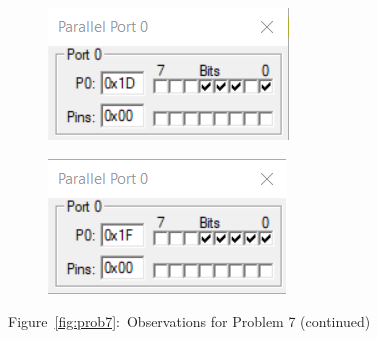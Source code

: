 \documentclass{lab_sheet}
\begin{document}
\begin{figure}[H]
\begin{subfigure}{.5\textwidth}
  \caption{}
  \label{fig:prob7-i}
\end{subfigure}
\begin{subfigure}{.5\textwidth}
  \centering
  \includegraphics[frame,width=.8\linewidth]{../Figures/1_7_j.png}   
  \caption{}
  \label{fig:prob7-j}
\end{subfigure}
\hspace*{\fill}
\begin{subfigure}{.5\textwidth}
  \centering
  \includegraphics[frame,width=.8\linewidth]{../Figures/1_7_k.png}   
  \caption{}
  \label{fig:prob7-k}
\end{subfigure}
\hspace*{\fill}
\caption*{Figure~\ref{fig:prob7}:~Observations for Problem 7 (continued)}
\end{figure}
\end{document}
